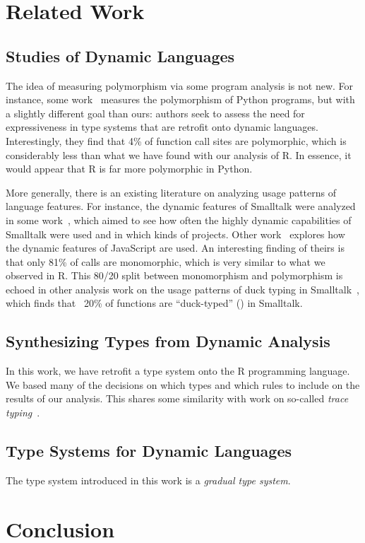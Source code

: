 \documentclass[sigplan,10pt,review,anonymous]{acmart}\settopmatter{printfolios=true,printccs=false,printacmref=false}
\begin{document}

%
%
%
%
%
%
\section{Related Work}

%
%
%
%
\subsection{Studies of Dynamic Languages}

The idea of measuring polymorphism via some program analysis is not new.
For instance, some work~\cite{aakerblom2015measuring} measures the polymorphism of Python programs, but with a slightly different goal than ours: authors seek to assess the need for expressiveness in type systems that are retrofit onto dynamic languages.
Interestingly, they find that 4\% of function call sites are polymorphic, which is considerably less than what we have found with our analysis of R.
In essence, it would appear that R is far more polymorphic in Python.

More generally, there is an existing literature on analyzing usage patterns of language features.  
For instance, the dynamic features of Smalltalk were analyzed in some work~\cite{callau2011howdevelopers}, which aimed to see how often the highly dynamic capabilities of Smalltalk were used and in which kinds of projects.
Other work~\cite{pldi10a} explores how the dynamic features of JavaScript are used.
An interesting finding of theirs is that only 81\% of calls are monomorphic, which is very similar to what we observed in R.
This 80/20 split between monomorphism and polymorphism is echoed in other analysis work on the usage patterns of duck typing in Smalltalk~\cite{milojkovic2017duck}, which finds that ~20\% of functions are ``duck-typed'' () in Smalltalk. 

%
%
%
%
\subsection{Synthesizing Types from Dynamic Analysis}

In this work, we have retrofit a type system onto the R programming language.
We based many of the decisions on which types and which rules to include on the results of our analysis.
This shares some similarity with work on so-called {\it trace typing}~\cite{andreasen2016trace}.

%
%
%
%
\subsection{Type Systems for Dynamic Languages}

The type system introduced in this work is a {\it gradual type system}.

%
%
%
%
%
\section{Conclusion}



%
%
%


\end{document}
